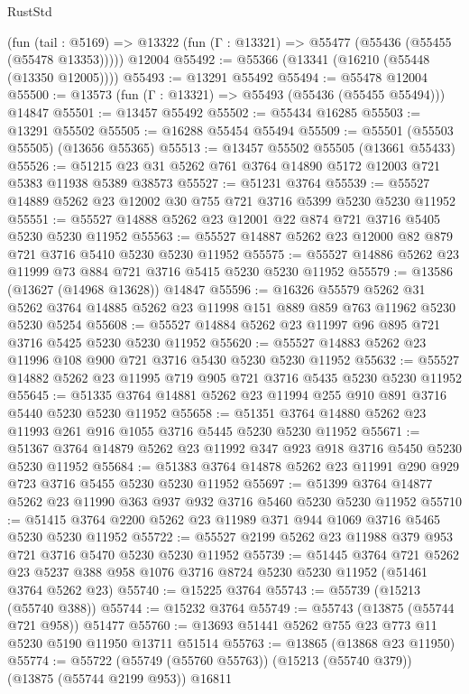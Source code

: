 \begin{lexlean}{RustStd}
\begin{coremodule}
    (fun (tail : @5169) => @13322 (fun (Γ : @13321) => @55477 (@55436 (@55455 (@55478 @13353)))))
    @12004
@55492 := @55366 (@13341 (@16210 (@55448 (@13350 @12005))))
@55493 := @13291 @55492
@55494 := @55478 @12004
@55500 := @13573 (fun (Γ : @13321) => @55493 (@55436 (@55455 @55494))) @14847
@55501 := @13457 @55492
@55502 := @55434 @16285
@55503 := @13291 @55502
@55505 := @16288 @55454 @55494
@55509 := @55501 (@55503 @55505) (@13656 @55365)
@55513 := @13457 @55502 @55505 (@13661 @55433)
@55526 := @51215 @23 @31 @5262 @761 @3764 @14890 @5172 @12003 @721 @5383 @11938 @5389 @38573
@55527 := @51231 @3764
@55539 := @55527 @14889 @5262 @23 @12002 @30 @755 @721 @3716 @5399 @5230 @5230 @11952
@55551 := @55527 @14888 @5262 @23 @12001 @22 @874 @721 @3716 @5405 @5230 @5230 @11952
@55563 := @55527 @14887 @5262 @23 @12000 @82 @879 @721 @3716 @5410 @5230 @5230 @11952
@55575 := @55527 @14886 @5262 @23 @11999 @73 @884 @721 @3716 @5415 @5230 @5230 @11952
@55579 := @13586 (@13627 (@14968 @13628)) @14847
@55596 := @16326
    @55579
    @5262
    @31
    @5262
    @3764
    @14885
    @5262
    @23
    @11998
    @151
    @889
    @859
    @763
    @11962
    @5230
    @5230
    @5254
@55608 := @55527 @14884 @5262 @23 @11997 @96 @895 @721 @3716 @5425 @5230 @5230 @11952
@55620 := @55527 @14883 @5262 @23 @11996 @108 @900 @721 @3716 @5430 @5230 @5230 @11952
@55632 := @55527 @14882 @5262 @23 @11995 @719 @905 @721 @3716 @5435 @5230 @5230 @11952
@55645 := @51335 @3764 @14881 @5262 @23 @11994 @255 @910 @891 @3716 @5440 @5230 @5230 @11952
@55658 := @51351 @3764 @14880 @5262 @23 @11993 @261 @916 @1055 @3716 @5445 @5230 @5230 @11952
@55671 := @51367 @3764 @14879 @5262 @23 @11992 @347 @923 @918 @3716 @5450 @5230 @5230 @11952
@55684 := @51383 @3764 @14878 @5262 @23 @11991 @290 @929 @723 @3716 @5455 @5230 @5230 @11952
@55697 := @51399 @3764 @14877 @5262 @23 @11990 @363 @937 @932 @3716 @5460 @5230 @5230 @11952
@55710 := @51415 @3764 @2200 @5262 @23 @11989 @371 @944 @1069 @3716 @5465 @5230 @5230 @11952
@55722 := @55527 @2199 @5262 @23 @11988 @379 @953 @721 @3716 @5470 @5230 @5230 @11952
@55739 := @51445
    @3764
    @721
    @5262
    @23
    @5237
    @388
    @958
    @1076
    @3716
    @8724
    @5230
    @5230
    @11952
    (@51461 @3764 @5262 @23)
@55740 := @15225 @3764
@55743 := @55739 (@15213 (@55740 @388))
@55744 := @15232 @3764
@55749 := @55743 (@13875 (@55744 @721 @958)) @51477
@55760 := @13693 @51441 @5262 @755 @23 @773 @11 @5230 @5190 @11950 @13711 @51514
@55763 := @13865 (@13868 @23 @11950)
@55774 := @55722 (@55749 (@55760 @55763)) (@15213 (@55740 @379)) (@13875 (@55744 @2199 @953)) @16811

\end{coremodule}
\end{lexlean}
